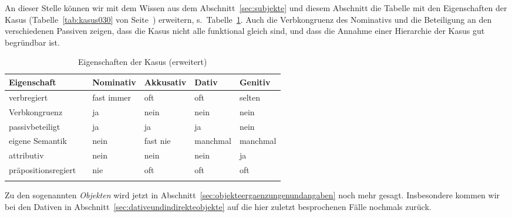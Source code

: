An dieser Stelle können wir mit dem Wissen aus dem Abschnitt~\ref{sec:subjekte} und diesem Abschnitt die Tabelle mit den Eigenschaften der Kasus (Tabelle~\ref{tab:kasus030} von Seite~\pageref{tab:kasus030}) erweitern, s.\ Tabelle~\ref{tab:bekommenpassiv157}.
Auch die Verbkongruenz des Nominativs und die Beteiligung an den verschiedenen Passiven zeigen, dass die Kasus nicht alle funktional gleich sind, und dass die Annahme einer Hierarchie der Kasus gut begründbar ist.

\begin{table}[!htbp]
  \begin{tabular}{lp{0.1cm}llll}
    \lsptoprule
     \textbf{Eigenschaft} && \textbf{Nominativ} & \textbf{Akkusativ} & \textbf{Dativ} & \textbf{Genitiv} \\
    \hline
    verbregiert && fast immer & oft & oft & selten \\
    Verbkongruenz && ja & nein & nein & nein \\
    passivbeteiligt && ja & ja & ja & nein \\
    eigene Semantik && nein & fast nie & manchmal & manchmal \\
    attributiv && nein & nein & nein & ja \\
    präpositionsregiert && nie & oft & oft & oft \\
    \lspbottomrule
  \end{tabular}
  \caption{Eigenschaften der Kasus (erweitert)}
  \label{tab:bekommenpassiv157}
\end{table}

Zu den sogenannten \textit{Objekten} wird jetzt in Abschnitt~\ref{sec:objekteergaenzungenundangaben} noch mehr gesagt.
Insbesondere kommen wir bei den Dativen in Abschnitt~\ref{sec:dativeundindirekteobjekte} auf die hier zuletzt besprochenen Fälle nochmals zurück.


